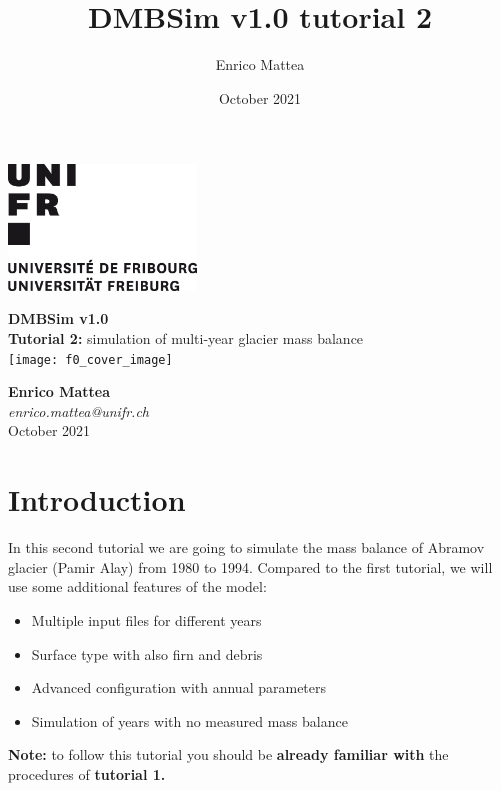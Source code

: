 \documentclass[15pt]{extarticle}
\title{DMBSim v1.0 tutorial 2}
\author{Enrico Mattea}
\date{October 2021}
\begin{document}

\begin{titlepage}
    \includegraphics[width=5cm]{unifr_logo}
    \par
    \vspace{2.0cm}
	\centering
	{\huge\textbf{DMBSim v1.0\\}}
	\vspace{0.3 cm}
	{\large \textbf{Tutorial 2:} simulation of multi-year glacier mass balance\\}
	\vspace{1.3 cm}
	\texttt{[image: f0\_cover\_image]}\par
	\vspace{1.3 cm}
	{\normalsize \textbf{Enrico Mattea}\\}
	{\normalsize \textit{enrico.mattea@unifr.ch\\}}
	\vspace{0.6 cm}
	{\normalsize October 2021}


	\vfill

\end{titlepage}


\section{Introduction}
In this second tutorial we are going to simulate the mass balance of Abramov glacier (Pamir Alay) from 1980 to 1994. Compared to the first tutorial, we will use some additional features of the model:

\begin{itemize}
    \item Multiple input files for different years
    \item Surface type with also firn and debris
    \item Advanced configuration with annual parameters
    \item Simulation of years with no measured mass balance
\end{itemize}
\textbf{Note:} to follow this tutorial you should be \textbf{already familiar with} the procedures of \textbf{tutorial 1.}
\end{document}

